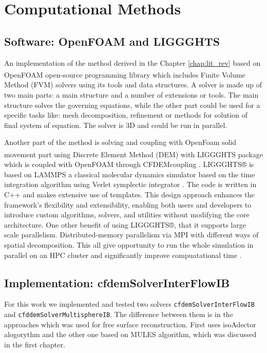 \chapter{Computational Methods} \label{chap:comp_met}

\section{Software: OpenFOAM and LIGGGHTS}
An implementation of the method derived in the Chapter \ref{chap:lit_rev} based on OpenFOAM\textsuperscript{\textregistered} \cite{jasak2007openfoam} open-source programming library which includes Finite Volume Method (FVM) solvers using its tools and data structures. A solver is made up of two main parts: a main structure and a number of extensions or tools. The main structure solves the governing equations, while the other part could be used for a specific tasks like: mesh decomposition, refinement or methods for solution of final system of equation. The solver is 3D and could be run in parallel.

Another part of the method is solving and coupling with OpenFoam solid movement part using Discrete Element Method (DEM) with LIGGGHTS\textsuperscript{\textregistered} package which is coupled with OpenFOAM through CFDEMcoupling \cite{kloss2011liggghts}. LIGGGHTS® is based on LAMMPS \cite{LAMMPS} a classical molecular dynamics simulator based on the time integration algorithm using Verlet symplectic integrator \cite{verlet}. The code is written in C++ and makes extensive use of templates. This design approach enhances the framework's flexibility and extensibility, enabling both users and developers to introduce custom algorithms, solvers, and utilities without modifying the core architecture. One other benefit of using LIGGGHTS®, that it supports large scale parallelism. Distributed-memory parallelism via MPI\cite{MPI} with different ways of spatial decomposition. This all give opportunity to run the whole simulation in parallel on an HPC cluster and significantly improve compuatational time .

\section{Implementation: cfdemSolverInterFlowIB}
For this work we implemented and tested two solvers \verb|cfdemSolverInterFlowIB| and \verb|cfddemSolverMultisphereIB|. The difference between them is in the approaches which was used for free surface reconstruction. First uses isoAdector alogorythm and the other one based on MULES \cite{MULES} algorithm, which was discussed in the first chapter.

